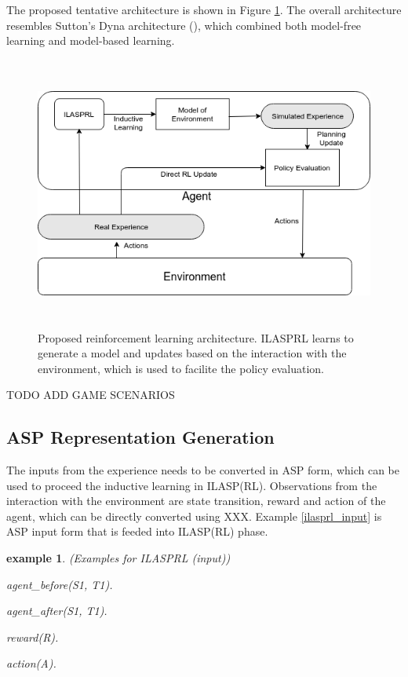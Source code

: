 \documentclass[12pt,twoside]{report}
\newtheorem{examp}{example}[section]
\begin{document}
The proposed tentative architecture is shown in Figure \ref{proposed_architecture}. The overall architecture resembles Sutton's Dyna architecture (\cite{Sutton1990}), which combined both model-free learning and model-based learning.

\begin{figure}[!htb]
\centering
\includegraphics[width=15cm, height=9cm]{./figures/ILASRL}
\caption{Proposed reinforcement learning architecture. ILASPRL learns to generate a model and updates based on the interaction with the environment, which is used to facilite the policy evaluation. }
\label{proposed_architecture}
\end{figure}


TODO ADD GAME SCENARIOS

\subsection{ASP Representation Generation}

The inputs from the experience needs to be converted in ASP form, which can be used to proceed the inductive learning in ILASP(RL).
Observations from the interaction with the environment are state transition, reward and action of the agent, which can be directly converted using XXX. Example \ref{ilasprl_input} is ASP input form that is feeded into ILASP(RL) phase.

\begin{examp} \normalfont (Examples for ILASPRL (input))

agent\_before(S1, T1).

agent\_after(S1, T1).

reward(R).

action(A).

\end{examp}
\label{ilasprl_input}
\end{document}
